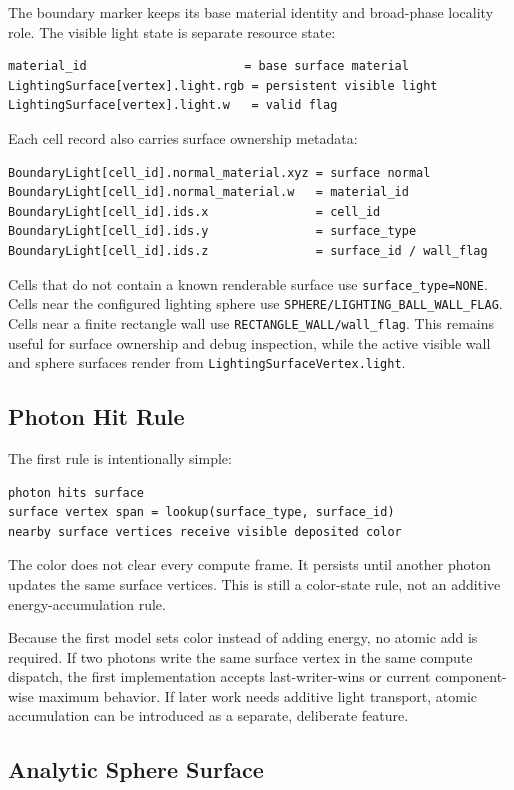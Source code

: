 The boundary marker keeps its base material identity and broad-phase locality
role.  The visible light state is separate resource state:
\begin{verbatim}
material_id                      = base surface material
LightingSurface[vertex].light.rgb = persistent visible light
LightingSurface[vertex].light.w   = valid flag
\end{verbatim}

Each cell record also carries surface ownership metadata:
\begin{verbatim}
BoundaryLight[cell_id].normal_material.xyz = surface normal
BoundaryLight[cell_id].normal_material.w   = material_id
BoundaryLight[cell_id].ids.x               = cell_id
BoundaryLight[cell_id].ids.y               = surface_type
BoundaryLight[cell_id].ids.z               = surface_id / wall_flag
\end{verbatim}
Cells that do not contain a known renderable surface use
\texttt{surface\_type=NONE}.  Cells near the configured lighting sphere use
\texttt{SPHERE/LIGHTING\_BALL\_WALL\_FLAG}.  Cells near a finite rectangle
wall use \texttt{RECTANGLE\_WALL/wall\_flag}.  This remains useful for
surface ownership and debug inspection, while the active visible wall and
sphere surfaces render from \texttt{LightingSurfaceVertex.light}.

\subsection{Photon Hit Rule}

The first rule is intentionally simple:
\begin{verbatim}
photon hits surface
surface vertex span = lookup(surface_type, surface_id)
nearby surface vertices receive visible deposited color
\end{verbatim}

The color does not clear every compute frame.  It persists until another photon
updates the same surface vertices.  This is still a color-state rule, not an additive
energy-accumulation rule.

Because the first model sets color instead of adding energy, no atomic add is
required.  If two photons write the same surface vertex in the same compute
dispatch, the first implementation accepts last-writer-wins or current
component-wise maximum behavior.  If later work needs additive light
transport, atomic accumulation can be introduced as a separate, deliberate
feature.

\subsection{Analytic Sphere Surface}

